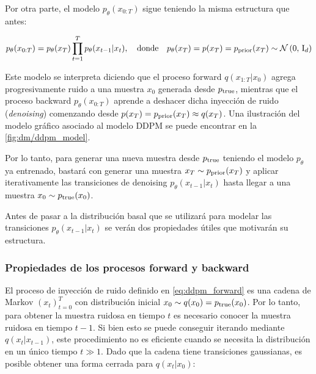 Por otra parte, el modelo $p_\theta(x_{0:T})$ sigue teniendo la misma estructura que antes:

\begin{equation}
    \label{eq:ddpm_backward}
    p_\theta(x_{0:T}) = p_\theta(x_T)\prod_{t=1}^{T} p_\theta(x_{t-1}|x_t),
    \quad\text{donde}\quad
    p_\theta(x_T) = p(x_T) = p_{\operatorname{prior}}(x_T) \sim \mathcal{N}\left(0,\,\operatorname{I}_{d}\right)
\end{equation}

Este modelo se interpreta diciendo que el proceso forward $q(x_{1:T}|x_0)$ agrega progresivamente ruido a una muestra $x_0$ generada desde $p_{\operatorname{true}}$, mientras que el proceso backward $p_\theta(x_{0:T})$ aprende a deshacer dicha inyección de ruido (\textit{denoising}) comenzando desde $p(x_T)= p_{\operatorname{prior}}(x_T)\approx q(x_T)$. Una ilustración del modelo gráfico asociado al modelo DDPM se puede encontrar en la \autoref{fig:dm/ddpm_model}.


Por lo tanto, para generar una nueva muestra desde $p_{\operatorname{true}}$ teniendo el modelo $p_\theta$ ya entrenado, bastará con generar una muestra $x_T\sim p_{\operatorname{prior}}(x_T)$ y aplicar iterativamente las transiciones de denoising $p_\theta(x_{t-1}|x_t)$ hasta llegar a una muestra $x_0\sim p_{\operatorname{true}}(x_0)$.

Antes de pasar a la distribución basal que se utilizará para modelar las transiciones $p_\theta(x_{t-1}|x_t)$ se verán dos propiedades útiles que motivarán su estructura.

\subsubsection{Propiedades de los procesos forward y backward}

El proceso de inyección de ruido definido en \eqref{eq:ddpm_forward} es una cadena de Markov $(x_t)_{t=0}^T$ con distribución inicial $x_0\sim q(x_0)=p_{\operatorname{true}}(x_0)$. Por lo tanto, para obtener la muestra ruidosa en tiempo $t$ es necesario conocer la muestra ruidosa en tiempo $t-1$. Si bien esto se puede conseguir iterando mediante $q(x_t|x_{t-1})$, este procedimiento no es eficiente cuando se necesita la distribución en un único tiempo $t\gg 1$. Dado que la cadena tiene transiciones gaussianas, es posible obtener una forma cerrada para $q(x_t|x_0)$:

